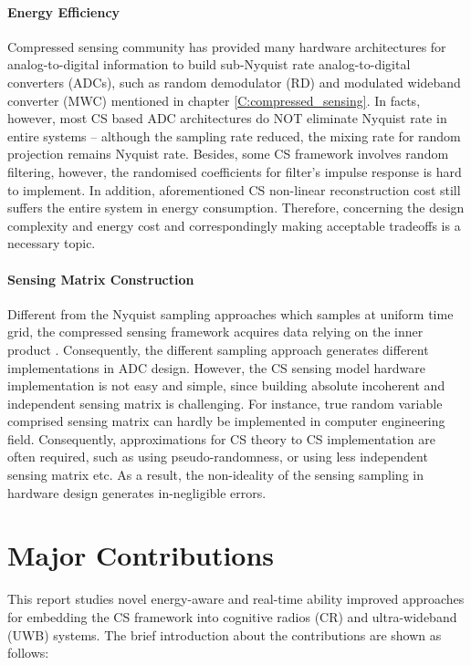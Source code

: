 \paragraph{Energy Efficiency}
Compressed sensing community has provided many hardware architectures for analog-to-digital information to build sub-Nyquist rate analog-to-digital converters (ADCs), such as random demodulator (RD) \cite{tropp2010beyond} and modulated wideband converter (MWC) \cite{mishali2009expected} mentioned in chapter \ref{C:compressed_sensing}. In facts, however, most CS based ADC architectures do NOT eliminate  Nyquist rate in entire systems -- although the sampling rate reduced, the mixing rate for random projection remains Nyquist rate. Besides, some CS framework involves random filtering, however, the randomised coefficients for filter's impulse response is hard to implement. In addition, aforementioned CS non-linear reconstruction cost still suffers the entire system in energy consumption. Therefore, concerning the design complexity and energy cost and correspondingly making acceptable tradeoffs is a necessary topic.  

\paragraph{Sensing Matrix Construction}
Different from the Nyquist sampling approaches which samples at uniform time grid, the compressed sensing framework acquires data relying on the inner product \cite{laska2011polyphase}. Consequently, the different sampling approach generates different implementations in ADC design. However, the CS sensing model hardware implementation is not easy and simple, since building absolute incoherent and independent sensing matrix is challenging. For instance, true random variable comprised sensing matrix can hardly be implemented in computer engineering field. Consequently, approximations for CS theory to CS implementation are often required, such as using pseudo-randomness, or using less independent sensing matrix etc. As a result, the non-ideality of the sensing sampling in hardware design generates in-negligible errors. 

\section{Major Contributions}
\indent \indent This report studies novel energy-aware and real-time ability improved approaches for embedding the CS framework into cognitive radios (CR) and ultra-wideband (UWB) systems. The brief introduction about the contributions are shown as follows:

